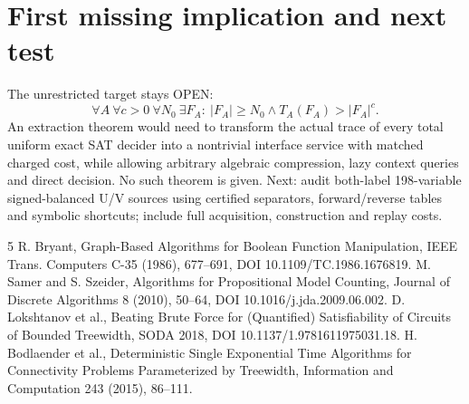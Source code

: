 \documentclass[11pt]{article}
\begin{document}
\section{First missing implication and next test}
The unrestricted target stays OPEN:
\[
\forall A\ \forall c>0\ \forall N_0\ \exists F_A:\ |F_A|\ge N_0\land T_A(F_A)>|F_A|^c.
\]
An extraction theorem would need to transform the actual trace of every total uniform exact SAT decider into a nontrivial interface service with matched charged cost, while allowing arbitrary algebraic compression, lazy context queries and direct decision. No such theorem is given. Next: audit both-label 198-variable signed-balanced U/V sources using certified separators, forward/reverse tables and symbolic shortcuts; include full acquisition, construction and replay costs.
\begin{thebibliography}{5}
 R. Bryant, Graph-Based Algorithms for Boolean Function Manipulation, IEEE Trans. Computers C-35 (1986), 677--691, DOI 10.1109/TC.1986.1676819.
 M. Samer and S. Szeider, Algorithms for Propositional Model Counting, Journal of Discrete Algorithms 8 (2010), 50--64, DOI 10.1016/j.jda.2009.06.002.
 D. Lokshtanov et al., Beating Brute Force for (Quantified) Satisfiability of Circuits of Bounded Treewidth, SODA 2018, DOI 10.1137/1.9781611975031.18.
 H. Bodlaender et al., Deterministic Single Exponential Time Algorithms for Connectivity Problems Parameterized by Treewidth, Information and Computation 243 (2015), 86--111.
\end{thebibliography}
\end{document}
